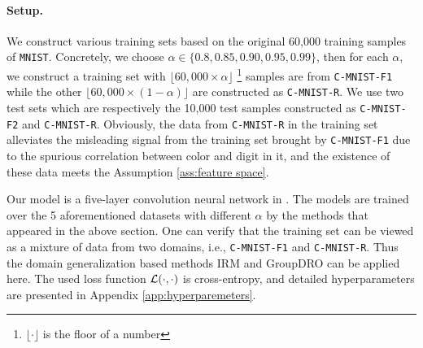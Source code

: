 \paragraph{Setup.} We construct various training sets based on the original 60,000 training samples of \texttt{MNIST}. Concretely, we choose $\alpha\in\{0.8, 0.85, 0.90, 0.95, 0.99\}$, then for each $\alpha$, we construct a training set with $\lfloor 60,000 \times\alpha\rfloor$ \footnote{$\lfloor\cdot\rfloor$ is the floor of a number} samples are from \texttt{C-MNIST-F1} while the other $\lfloor 60,000 \times(1 - \alpha)\rfloor$ are constructed as \texttt{C-MNIST-R}. We use two test sets which are respectively the 10,000 test samples constructed as \texttt{C-MNIST-F2} and \texttt{C-MNIST-R}. Obviously, the data from \texttt{C-MNIST-R} in the training set alleviates the misleading signal from the training set brought by \texttt{C-MNIST-F1} due to the spurious correlation between color and digit in it, and the existence of these data meets the Assumption \ref{ass:feature space}. 
\par
Our model is a five-layer convolution neural network in \citep{arpit2019predicting}. The models are trained over the 5 aforementioned datasets with different $\alpha$ by the methods that appeared in the above section. One can verify that the training set can be viewed as a mixture of data from two domains, i.e., \texttt{C-MNIST-F1} and \texttt{C-MNIST-R}. Thus the domain generalization based methods IRM and GroupDRO can be applied here. The used loss function $\mathcal{L}(\cdot, \cdot)$ is cross-entropy, and detailed hyperparameters are presented in Appendix \ref{app:hyperparemeters}.
